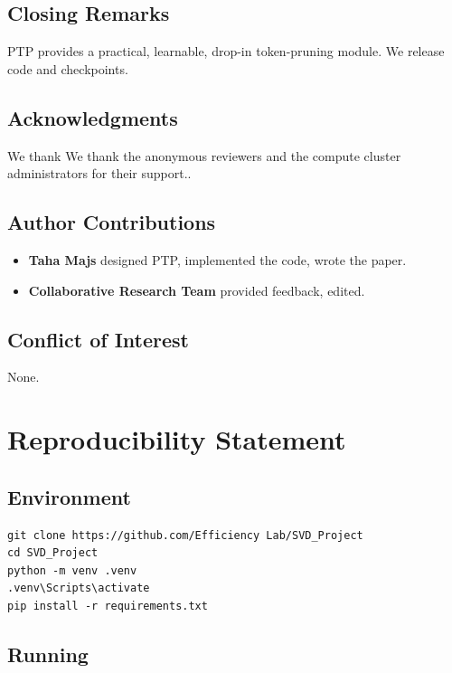 \subsection{Closing Remarks}

PTP provides a practical, learnable, drop-in token-pruning module. We 
release code and checkpoints.

\subsection{Acknowledgments}

We thank We thank the anonymous reviewers and the compute cluster administrators for their support..

\subsection{Author Contributions}

\begin{itemize}
\item \textbf{Taha Majs} designed PTP, implemented the code, wrote the paper.
\item \textbf{Collaborative Research Team} provided feedback, edited.

\end{itemize}
\subsection{Conflict of Interest}

None.




\section{Reproducibility Statement}

\subsection{Environment}

\begin{lstlisting}
git clone https://github.com/Efficiency Lab/SVD_Project
cd SVD_Project
python -m venv .venv
.venv\Scripts\activate
pip install -r requirements.txt
\end{lstlisting}

\subsection{Running}

